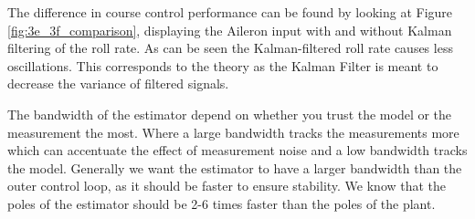 The difference in course control performance can be found by looking at Figure \ref{fig:3e_3f_comparison}, displaying the Aileron input with and without Kalman filtering of the roll rate. As can be seen the Kalman-filtered roll rate causes less oscillations. This corresponds to the theory as the Kalman Filter is meant to decrease the variance of filtered signals.

The bandwidth of the estimator depend on whether you trust the model or the measurement the most. Where a large bandwidth tracks the measurements more which can accentuate the effect of measurement noise and a low bandwidth tracks the model. Generally we want the estimator to have a larger bandwidth than the outer control loop, as it should be faster to ensure stability. We know that the poles of the estimator should be 2-6 times faster than the poles of the plant. 


